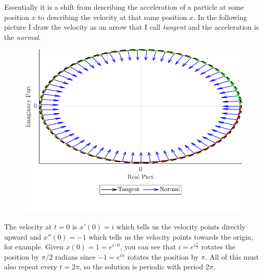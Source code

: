 \documentclass[12pt]{article} %
\begin{document}
\begin{solution}
\begin{enumerate}[(a)]
Essentially it is a shift from describing the acceleration of a particle at some position $x$ to describing the velocity at that same position $x$. In the following picture I draw the velocity as an arrow that I call \emph{tangent} and the acceleration is the \emph{normal}.
\begin{figure}[H]
    \centering
    \includegraphics[width=.5\textwidth]{acceleration.png}
\end{figure}
The velocity at $t=0$ is $x'(0)=i$ which tells us the velocity points directly upward and $x''(0)=-1$ which tells us the velocity points towards the origin, for example. Given $x(0)=1=e^{i\cdot 0}$, you can see that $i=e^{i\frac{\pi}{2}}$ rotates the position by $\pi/2$ radians since $-1=e^{i\pi}$ rotates the position by $\pi$. All of this must also repeat every $t=2\pi$, so the solution is periodic with period $2\pi$.
\end{enumerate}
\end{solution}
\end{document}
